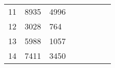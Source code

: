 \begin{table}[tb]
\begin{tabular}{|l|l|l|lllll}
		11                       & 8935                      & 4996                      &                           &                           &                           &                           &                           \\ \cline{1-3}
		12                       & 3028                      & 764                       &                           &                           &                           &                           &                           \\ \cline{1-3}
		13                       & 5988                      & 1057                      &                           &                           &                           &                           &                           \\ \cline{1-3}
		14                       & 7411                      & 3450                      &                           &                           &                           &                           &                           \\ \cline{1-3}
	\end{tabular}
	
	
\end{table}

